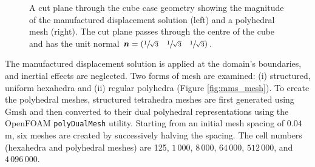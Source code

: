 \documentclass[sn-mathphys,Numbered]{sn-jnl}%
\newcommand{\bb}{\boldsymbol}
\begin{document}
\begin{figure}[htbp]
	\centering
	\caption{A cut plane through the cube case geometry showing the magnitude of the manufactured displacement solution (left) and a polyhedral mesh (right). The cut plane passes through the centre of the cube and has the unit normal $\bb{n} = (\sfrac{1}{\sqrt{3}} \quad \sfrac{1}{\sqrt{3}} \quad \sfrac{1}{\sqrt{3}})$.}
	\label{fig:mms}
\end{figure}

The manufactured displacement solution is applied at the domain's boundaries, and inertial effects are neglected.
Two forms of mesh are examined: (i) structured, uniform hexahedra and (ii) regular polyhedra (Figure \ref{fig:mms_mesh}).
To create the polyhedral meshes, structured tetrahedra meshes are first generated using Gmsh \cite{Geuzaine2009} and then converted to their dual polyhedral representations using the OpenFOAM \texttt{polyDualMesh} utility.
Starting from an initial mesh spacing of $0.04$ m, six meshes are created by successively halving the spacing.
The cell numbers (hexahedra and polyhedral meshes) are 125, $1\,000$, $8\,000$, $64\,000$, $512\,000$, and $4\,096\,000$.
\end{document}
